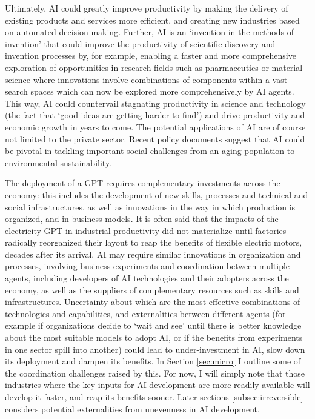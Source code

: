 \documentclass[11pt]{article}
\begin{document}
Ultimately, AI could greatly improve productivity by making the delivery of existing products and services more efficient, and creating new industries based on automated decision-making. Further, AI is an `invention in the methods of invention' that could improve the productivity of scientific discovery and invention processes by, for example, enabling a faster and more comprehensive exploration of opportunities in research fields such as pharmaceutics or material science where innovations involve combinations of components within a vast search spaces which can now be explored more comprehensively by AI agents. This way, AI could countervail stagnating productivity in science and technology (the fact that `good ideas are getting harder to find') and drive productivity and economic growth in years to come.  The potential applications of AI are of course not limited to the private sector. Recent policy documents suggest that AI could be pivotal in tackling important social challenges from an aging population to environmental sustainability. 

The deployment of a GPT requires complementary investments across the economy: this includes the development of new skills, processes and technical and social infrastructures, as well as innovations in the way in which production is organized, and in business models. It is often said that the impacts of the electricity GPT in industrial productivity did not materialize until factories radically reorganized their layout to reap the benefits of flexible electric motors, decades after its arrival. AI may require similar innovations in organization and processes, involving business experiments and coordination between multiple agents, including developers of AI technologies and their adopters across the economy, as well as the suppliers of complementary resources such as skills and infrastructures. Uncertainty about which are the most effective combinations of technologies and capabilities, and externalities between different agents (for example if organizations decide to `wait and see' until there is better knowledge about the most suitable models to adopt AI, or if the benefits from experiments in one sector spill into another) could lead to under-investment in AI, slow down its deployment and dampen its benefits. In Section \ref{sec:micro} I outline some of the coordination challenges raised by this. For now, I will simply note that those industries where the key inputs for AI development are more readily available will develop it faster, and reap its benefits sooner. Later sections \ref{subsec:irreversible} considers potential externalities from unevenness in AI development.
\end{document}
